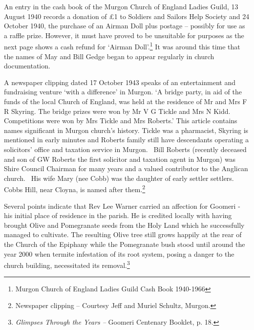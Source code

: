 An entry in the cash book of the Murgon Church of England Ladies Guild,
13 August 1940 records a donation of \pounds1 to Soldiers and Sailors Help
Society and 24 October 1940, the purchase of an Airman Doll plus postage
-- possibly for use as a raffle prize. However, it must have proved to
be unsuitable for purposes as the next page shows a cash refund for
`Airman Doll'.\footnote{Murgon Church of England Ladies Guild Cash Book
  1940-1966} It was around this time that the names of May and Bill
Gedge began to appear regularly in church documentation.

A newspaper clipping dated 17 October 1943 speaks of an entertainment
and fundraising venture `with a difference' in Murgon. `A bridge party,
in aid of the funds of the local Church of England, was held at the
residence of Mr and Mrs F R Skyring. The bridge prizes were won by Mr V
G Tickle and Mrs N Kidd. Competitions were won by Mrs Tickle and Mrs
Roberts.' This article contains names significant in Murgon church's
history. Tickle was a pharmacist, Skyring is mentioned in early minutes
and Roberts family still have descendants operating a solicitors' office
and taxation service in Murgon.~ Bill Roberts (recently deceased and son
of GW Roberts the first solicitor and taxation agent in Murgon) was
Shire Council Chairman for many years and a valued contributor to the
Anglican church.~ His wife Mary (nee Cobb) was the daughter of early
settler settlers.~ Cobbs Hill, near Cloyna, is named after
them.\footnote{Newspaper clipping -- Courtesy Jeff and Muriel Schultz,
  Murgon.}

Several points indicate that Rev Lee Warner carried an affection for
Goomeri - his initial place of residence in the parish. He is credited
locally with having brought Olive and Pomegranate seeds from the Holy
Land which he successfully managed to cultivate. The resulting Olive
tree still grows happily at the rear of the Church of the Epiphany while
the Pomegranate bush stood until around the year 2000 when termite
infestation of its root system, posing a danger to the church building,
necessitated its removal.\footnote{\emph{Glimpses Through the Years --}
  Goomeri Centenary Booklet, p. 18.}

